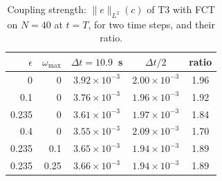 \begin{table}[t]
  \centering
  \caption{Coupling strength: $\|e\|_{L^2}(c)$ of T3 with FCT on $N=40$ at $t=T$, for
    two time steps, and their ratio.}
  \label{tab:mms_sweep}
  \small
  \begin{tabular}{rr ccc}
    \hline
    $\epsilon$ & $\omega_{\max}$ & $\Delta t=10.9$~s & $\Delta t/2$ & ratio \\
    \hline
    0     & 0    & $3.92\times10^{-3}$ & $2.00\times10^{-3}$ & 1.96 \\
    0.1   & 0    & $3.76\times10^{-3}$ & $1.96\times10^{-3}$ & 1.92 \\
    0.235 & 0    & $3.61\times10^{-3}$ & $1.97\times10^{-3}$ & 1.84 \\
    0.4   & 0    & $3.55\times10^{-3}$ & $2.09\times10^{-3}$ & 1.70 \\
    0.235 & 0.1  & $3.65\times10^{-3}$ & $1.94\times10^{-3}$ & 1.89 \\
    0.235 & 0.25 & $3.66\times10^{-3}$ & $1.94\times10^{-3}$ & 1.89 \\
    \hline
  \end{tabular}
\end{table}
